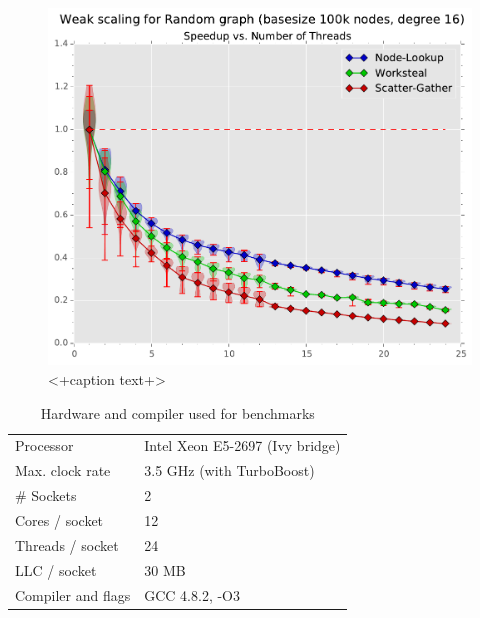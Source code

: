 \begin{figure}[ht]
	\centering
	\includegraphics[width=\columnwidth]{plots/weakscaling_gtRANDOMLIN16_n1000000_deg16.pdf}
	\caption{<+caption text+>}
	\label{fig:<+label+>}
\end{figure}



  \begin{table}[h]
    \centering
    \begin{tabular}{ll}
    \toprule
    Processor        & Intel Xeon E5-2697 (Ivy bridge) \\
    Max. clock rate  & 3.5 GHz (with TurboBoost)\\
    \# Sockets       & 2 \\
    Cores / socket   & 12 \\
    Threads / socket & 24 \\
    LLC / socket     & 30 MB \\
    \midrule
    Compiler and flags & GCC 4.8.2, -O3\\
    \bottomrule
    \end{tabular}
    \caption{Hardware and compiler used for benchmarks}
    \label{tab:hardware}
  \end{table}
 
